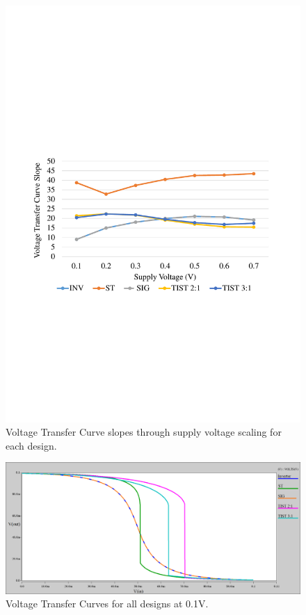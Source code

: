 \documentclass[pgmicro,mestrado,english]{iiufrgs}
\begin{document}
    \begin{figure}[]
        \centering
            \includegraphics[width=1\textwidth, trim={1.25cm 9cm 2cm 10cm}, clip]{slopes.pdf}
            \caption{Voltage Transfer Curve slopes through supply voltage scaling for each design.}
        \label{fig:slopes}
    \end{figure}
    
    \begin{figure}[]
        \centering
            \includegraphics[width=1\textwidth, trim={0cm 0cm 0cm 0cm}, clip]{vtcs01.png}
            \caption{Voltage Transfer Curves for all designs at 0.1V.}
        \label{fig:vtcs01}
    \end{figure}
    
\end{document}
